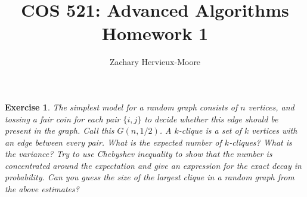 \documentclass[12pt]{article}
\title{COS 521: Advanced Algorithms \\ Homework 1}
\author{Zachary Hervieux-Moore}
\date{\displaydate{date}}
\theoremstyle{colon}
\newtheorem{exercise}{Exercise}
\begin{document}
\maketitle

\clearpage

\begin{exercise}
  The simplest model for a \textit{random graph} consists of $n$ vertices, and tossing a fair coin for each pair $\{ i, j \}$ to decide whether this edge should be present in the graph. Call this $G(n, 1/2)$. A $k$-clique is a set of $k$ vertices with an edge between every pair. What is the expected number of $k$-cliques? What is the variance? Try to use Chebyshev inequality to show that the number is concentrated around the expectation and give an expression for the exact decay in probability. Can you guess the size of the largest clique in a random graph from the above estimates?
\end{exercise}
\end{document}
